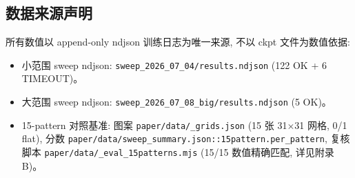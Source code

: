 \subsection{数据来源声明}

所有数值以 append-only ndjson 训练日志为唯一来源, 不以 ckpt 文件为数值依据:
\begin{itemize}[leftmargin=*, itemsep=0pt, topsep=0pt]
  \item 小范围 sweep ndjson: \texttt{sweep\_2026\_07\_04/results.ndjson} (122 OK + 6 TIMEOUT)。
  \item 大范围 sweep ndjson: \texttt{sweep\_2026\_07\_08\_big/results.ndjson} (5 OK)。
  \item 15-pattern 对照基准: 图案 \texttt{paper/data/\_grids.json} (15 张 31$\times$31 网格, 0/1 flat), 分数 \texttt{paper/data/sweep\_summary.json::15pattern.per\_pattern}, 复核脚本 \texttt{paper/data/\_eval\_15patterns.mjs} (15/15 数值精确匹配, 详见附录 B)。
\end{itemize}
